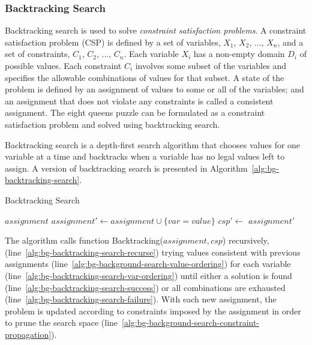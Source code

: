 \subsubsection{Backtracking Search}
\label{sec:bg-backtracking-search}

Backtracking search is used to solve {\em constraint satisfaction
problems}. A constraint satisfaction problem (CSP) is defined by a set
of variables, $X_1$, $X_2$, ..., $X_n$, and a set of constraints,
$C_1$, $C_2$, ..., $C_n$. Each variable $X_i$ has a non-empty domain
$D_i$ of possible values. Each constraint $C_i$ involves some subset
of the variables and specifies the allowable combinations of values
for that subset. A state of the problem is defined by an assignment of
values to some or all of the variables; and an assignment that does
not violate any constraints is called a consistent assignment. The eight
queens puzzle can be formulated as a constraint satisfaction problem
and solved using backtracking search.

Backtracking search is a depth-first search algorithm that chooses
values for one variable at a time and backtracks when a variable has
no legal values left to assign. A version of backtracking search is
presented in Algorithm~\ref{alg:bg-backtracking-search}.
\begin{algorithm}
\caption{Backtracking Search}
\label{alg:bg-backtracking-search}
\begin{algorithmic}[1]
   \Return $assignment$
\EndIf
{} \label{alg:bg-backtracking-search-var-ordering}
 \label{alg:bg-background-search-value-ordering}
  \State $assignment' \leftarrow assignment \cup \{var=value\}$
  \State $csp' \leftarrow $ \label{alg:bg-background-search-constraint-propagation}
   \label{alg:bg-backtracking-search-recurse}
     \State \Return $assignment'$ \label{alg:bg-backtracking-search-success}
  \EndIf
\EndFor
\State {} \label{alg:bg-backtracking-search-failure}
\EndProcedure
\end{algorithmic}
\end{algorithm}
The algorithm calls function {\sc Backtracking}($assignment, csp$)
recursively, (line~\ref{alg:bg-backtracking-search-recurse})
trying values consistent with previous assignments
(line~\ref{alg:bg-background-search-value-ordering})
for each variable
(line~\ref{alg:bg-backtracking-search-var-ordering})
until either a solution is found
(line~\ref{alg:bg-backtracking-search-success}) or all combinations
are exhausted (line~\ref{alg:bg-backtracking-search-failure}). With
each new assignment, the problem is updated according to constraints
imposed by the assignment in order to prune the search space (line~\ref{alg:bg-background-search-constraint-propagation}).

